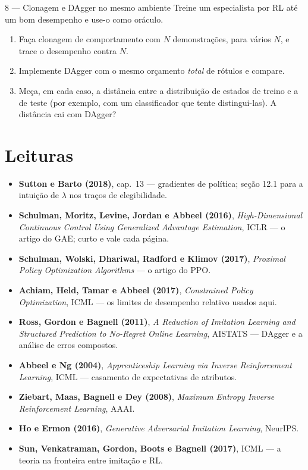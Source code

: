 \documentclass[11pt]{article}
\begin{document}
\begin{exbox}{8 --- Clonagem e DAgger no mesmo ambiente}
  Treine um especialista por RL até um bom desempenho e use-o como oráculo.
  \begin{enumerate}
    \item Faça clonagem de comportamento com $N$ demonstrações, para vários $N$, e trace
      o desempenho contra $N$.
    \item Implemente DAgger com o mesmo orçamento \emph{total} de rótulos e compare.
    \item Meça, em cada caso, a distância entre a distribuição de estados de treino e a
      de teste (por exemplo, com um classificador que tente distingui-las). A distância
      cai com DAgger?
  \end{enumerate}
\end{exbox}

\section*{Leituras}

\begin{itemize}
  \item \textbf{Sutton e Barto (2018)}, cap.\ 13 --- gradientes de política; seção 12.1
    para a intuição de $\lambda$ nos traços de elegibilidade.
  \item \textbf{Schulman, Moritz, Levine, Jordan e Abbeel (2016)},
    \emph{High-Dimensional Continuous Control Using Generalized Advantage Estimation},
    ICLR --- o artigo do GAE; curto e vale cada página.
  \item \textbf{Schulman, Wolski, Dhariwal, Radford e Klimov (2017)},
    \emph{Proximal Policy Optimization Algorithms} --- o artigo do PPO.
  \item \textbf{Achiam, Held, Tamar e Abbeel (2017)},
    \emph{Constrained Policy Optimization}, ICML --- os limites de desempenho relativo
    usados aqui.
  \item \textbf{Ross, Gordon e Bagnell (2011)}, \emph{A Reduction of Imitation Learning
    and Structured Prediction to No-Regret Online Learning}, AISTATS --- DAgger e a
    análise de erros compostos.
  \item \textbf{Abbeel e Ng (2004)}, \emph{Apprenticeship Learning via Inverse
    Reinforcement Learning}, ICML --- casamento de expectativas de atributos.
  \item \textbf{Ziebart, Maas, Bagnell e Dey (2008)}, \emph{Maximum Entropy Inverse
    Reinforcement Learning}, AAAI.
  \item \textbf{Ho e Ermon (2016)}, \emph{Generative Adversarial Imitation Learning},
    NeurIPS.
  \item \textbf{Sun, Venkatraman, Gordon, Boots e Bagnell (2017)}, ICML --- a teoria na
    fronteira entre imitação e RL.
\end{itemize}
\end{document}
